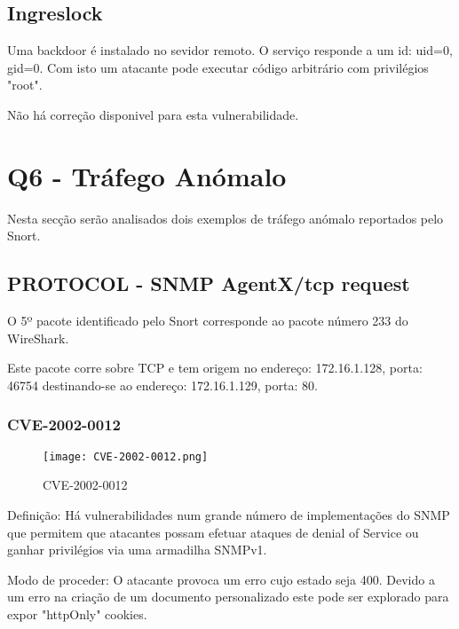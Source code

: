 \subsection{Ingreslock}

\par Uma backdoor é instalado no sevidor remoto. O serviço responde a um id: uid=0, gid=0. Com isto um atacante pode executar código arbitrário com privilégios "root".
\par Não há correção disponivel para esta vulnerabilidade.




\section{Q6 - Tráfego Anómalo}

Nesta secção serão analisados dois exemplos de tráfego anómalo reportados pelo Snort.

\subsection{PROTOCOL - SNMP AgentX/tcp request}

\par O 5º pacote identificado pelo Snort corresponde ao pacote número 233 do WireShark.
\par Este pacote corre sobre TCP e tem origem no endereço: 172.16.1.128, porta: 46754 destinando-se ao endereço: 172.16.1.129, porta: 80.

\subsubsection{CVE-2002-0012}

\begin{figure}[H]

  \centering

  \texttt{[image: CVE-2002-0012.png]}

  \caption {CVE-2002-0012}

  \label {fig2}

\end{figure}

\par Definição: Há vulnerabilidades num grande número de implementações do SNMP que permitem que atacantes possam efetuar ataques de denial of Service ou ganhar privilégios via uma armadilha SNMPv1.

\par Modo de proceder: O atacante provoca um erro cujo estado seja 400. Devido a um erro na criação de um documento personalizado este pode ser explorado para expor "httpOnly" cookies.

